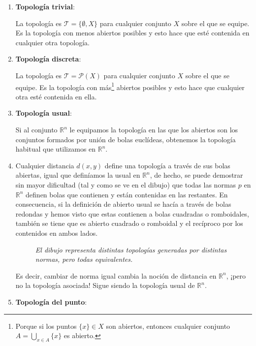 \begin{ej}
\begin{enumerate}
    \item \textbf{Topología trivial}: \label{ejemplos_topologia:first}
    
    La topología es $\mathcal{T} = \{\emptyset, X\}$ para cualquier conjunto $X$ sobre el que se equipe. Es la topología con menos abiertos posibles y esto hace que esté contenida en cualquier otra topología.
    \item \textbf{Topología discreta}:
    
    La topología es $\mathcal{T} = \mathcal{P}\left( X \right)$ para cualquier conjunto $X$ sobre el que se equipe. Es la topología con más\footnote{Porque si los puntos $\{x\} \in X$ son abiertos, entonces cualquier conjunto $A = \bigcup_{x \in A} \{x\}$ es abierto.} abiertos posibles y esto hace que cualquier otra esté contenida en ella.
    \item \textbf{Topología usual}:
    
    Si al conjunto $\mathbb{R}^n$ le equipamos la topología en las que los abiertos son los conjuntos formados por unión de bolas euclídeas, obtenemos la topología habitual que utilizamos en $\mathbb{R}^n$.
    
    \item Cualquier distancia $d(x,y)$ define una topología a través de sus bolas abiertas, igual que definíamos la usual en $\mathbb{R}^n$, de hecho, se puede demostrar sin mayor dificultad (tal y como se ve en el dibujo) que todas las normas $p$ en $\mathbb{R}^n$ definen bolas que contienen y están contenidas en las restantes. En consecuencia, si la definición de abierto usual se hacía a través de bolas redondas y hemos visto que estas contienen a bolas cuadradas o romboidales, también se tiene que es abierto cuadrado o romboidal y el recíproco por los contenidos en ambos lados.
    \begin{figure}[H]
        \centering
        \caption{\textit{El dibujo representa distintas topologías generadas por distintas normas, pero todas equivalentes.}}
        \label{fig:normas-topología}
    \end{figure}

    Es decir, cambiar de norma igual cambia la noción de distancia en $\mathbb{R}^n$, ¡pero no la topología asociada! Sigue siendo la topología usual de $\mathbb{R}^n$.
    
    \item \textbf{Topología del punto}:
    

\end{enumerate}
\end{ej}

